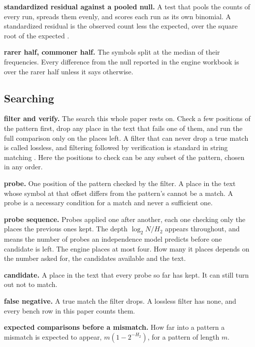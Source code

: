 \noindent\textbf{standardized residual against a pooled null.} A test that pools the counts of every run, spreads them evenly, and scores each run as its own binomial. A standardized residual is the observed count less the expected, over the square root of the expected \cite{src:Haberman-1973}.

\noindent\textbf{rarer half, commoner half.} The symbols split at the median of their frequencies. Every difference from the null reported in the engine workbook \cite{src:Quigg-orior-workbook} is over the rarer half unless it says otherwise.

\subsection{Searching}

\noindent\textbf{filter and verify.} The search this whole paper rests on. Check a few positions of the pattern first, drop any place in the text that fails one of them, and run the full comparison only on the places left. A filter that can never drop a true match is called lossless, and filtering followed by verification is standard in string matching \cite{src:Navarro}. Here the positions to check can be any subset of the pattern, chosen in any order.

\noindent\textbf{probe.} One position of the pattern checked by the filter. A place in the text whose symbol at that offset differs from the pattern's cannot be a match. A probe is a necessary condition for a match and never a sufficient one.

\noindent\textbf{probe sequence.} Probes applied one after another, each one checking only the places the previous ones kept. The depth \(\log_2 N / H_2\) appears throughout, and means the number of probes an independence model predicts before one candidate is left. The engine places at most four. How many it places depends on the number asked for, the candidates available and the text.

\noindent\textbf{candidate.} A place in the text that every probe so far has kept. It can still turn out not to match.

\noindent\textbf{false negative.} A true match the filter drops. A lossless filter has none, and every bench row in this paper counts them.

\noindent\textbf{expected comparisons before a mismatch.} How far into a pattern a mismatch is expected to appear, \(m(1-2^{-H_2})\), for a pattern of length \(m\).

